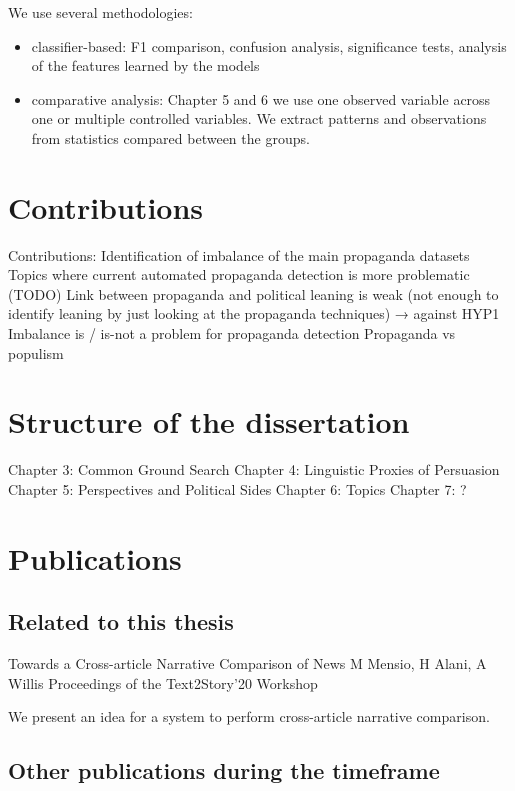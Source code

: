 We use several methodologies:
\begin{itemize}
    \item classifier-based: F1 comparison, confusion analysis, significance tests, analysis of the features learned by the models 
    \item comparative analysis: Chapter 5 and 6 we use one observed variable across one or multiple controlled variables. We extract patterns and observations from statistics compared between the groups.
\end{itemize}


\section{Contributions}
\label{sec:intro_contributions}

Contributions:
Identification of imbalance of the main propaganda datasets
Topics where current automated propaganda detection is more problematic (TODO) 
Link between propaganda and political leaning is weak (not enough to identify leaning by just looking at the propaganda techniques) → against HYP1
Imbalance is / is-not a problem for propaganda detection
Propaganda vs populism

\section{Structure of the dissertation}
\label{sec:intro_structure}

Chapter 3: Common Ground Search
Chapter 4: Linguistic Proxies of Persuasion
Chapter 5: Perspectives and Political Sides
Chapter 6: Topics
Chapter 7: ?

\section{Publications}
\label{sec:intro_publications}

\subsection{Related to this thesis}

Towards a Cross-article Narrative Comparison of News
M Mensio, H Alani, A Willis
Proceedings of the Text2Story’20 Workshop

We present an idea for a system to perform cross-article narrative comparison.

\subsection{Other publications during the timeframe}

